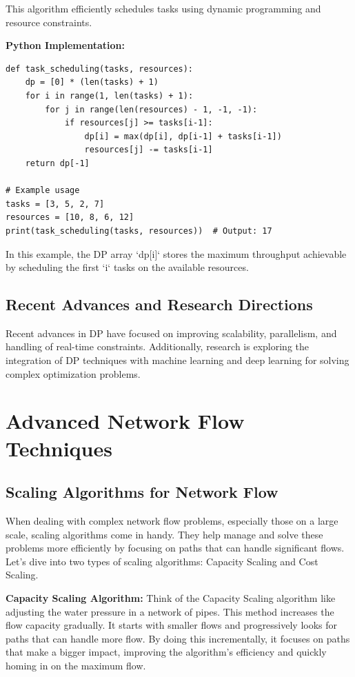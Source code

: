 \documentclass[12pt]{book} %
\begin{document}
This algorithm efficiently schedules tasks using dynamic programming and resource constraints.

\textbf{Python Implementation:}
\FloatBarrier
\begin{lstlisting}
def task_scheduling(tasks, resources):
    dp = [0] * (len(tasks) + 1)
    for i in range(1, len(tasks) + 1):
        for j in range(len(resources) - 1, -1, -1):
            if resources[j] >= tasks[i-1]:
                dp[i] = max(dp[i], dp[i-1] + tasks[i-1])
                resources[j] -= tasks[i-1]
    return dp[-1]

# Example usage
tasks = [3, 5, 2, 7]
resources = [10, 8, 6, 12]
print(task_scheduling(tasks, resources))  # Output: 17
\end{lstlisting}
\FloatBarrier
In this example, the DP array `dp[i]` stores the maximum throughput achievable by scheduling the first `i` tasks on the available resources.


\subsection{Recent Advances and Research Directions}

Recent advances in DP have focused on improving scalability, parallelism, and handling of real-time constraints. Additionally, research is exploring the integration of DP techniques with machine learning and deep learning for solving complex optimization problems.


\section{Advanced Network Flow Techniques}

\subsection{Scaling Algorithms for Network Flow}

When dealing with complex network flow problems, especially those on a large scale, scaling algorithms come in handy. They help manage and solve these problems more efficiently by focusing on paths that can handle significant flows. Let's dive into two types of scaling algorithms: Capacity Scaling and Cost Scaling.

\textbf{Capacity Scaling Algorithm:}
Think of the Capacity Scaling algorithm like adjusting the water pressure in a network of pipes. This method increases the flow capacity gradually. It starts with smaller flows and progressively looks for paths that can handle more flow. By doing this incrementally, it focuses on paths that make a bigger impact, improving the algorithm's efficiency and quickly homing in on the maximum flow.
\end{document}
